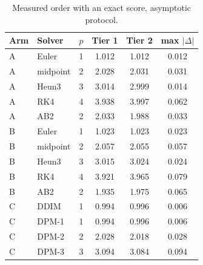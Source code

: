\documentclass[sigconf]{acmart}
\begin{document}
\begin{table}[t]
\caption{Measured order with an exact score, asymptotic protocol.}
\label{tab:order12}
\small
\begin{tabular}{@{}llcccc@{}}
\toprule
Arm & Solver & $p$ & Tier 1 & Tier 2 & max $|\Delta|$ \\
\midrule
A & Euler    & 1 & 1.012 & 1.012 & 0.012 \\
A & midpoint & 2 & 2.028 & 2.031 & 0.031 \\
A & Heun3    & 3 & 3.014 & 2.999 & 0.014 \\
A & RK4      & 4 & 3.938 & 3.997 & 0.062 \\
A & AB2      & 2 & 2.033 & 1.988 & 0.033 \\
\midrule
B & Euler    & 1 & 1.023 & 1.023 & 0.023 \\
B & midpoint & 2 & 2.057 & 2.055 & 0.057 \\
B & Heun3    & 3 & 3.015 & 3.024 & 0.024 \\
B & RK4      & 4 & 3.921 & 3.965 & 0.079 \\
B & AB2      & 2 & 1.935 & 1.975 & 0.065 \\
\midrule
C & DDIM     & 1 & 0.994 & 0.996 & 0.006 \\
C & DPM-1    & 1 & 0.994 & 0.996 & 0.006 \\
C & DPM-2    & 2 & 2.028 & 2.018 & 0.028 \\
C & DPM-3    & 3 & 3.094 & 3.084 & 0.094 \\
\bottomrule
\end{tabular}
\end{table}
\end{document}
